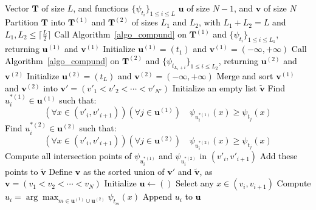 \documentclass[review]{elsarticle}
\newcommand{\cblue}{\textcolor{black}}
\begin{document}

\cblue{
\begin{algorithm}[H]
\caption{Recursive Compound Minimization Algorithm}
\label{algo_compund}
\begin{algorithmic}[1]
\Require Vector $\mathbf{T}$ of size $L$, and functions $\{\psi_{t_i}\}_{1 \leq i \leq L}$
\Ensure $\mathbf{u}$ of size $N-1$, and $\mathbf{v}$ of size $N$
\State Partition $\mathbf{T}$ into $\mathbf{T}^{(1)}$ and $\mathbf{T}^{(2)}$ of sizes $L_1$ and $L_2$, with $L_1 + L_2 = L$ and $L_1, L_2 \leq \lceil \tfrac{L}{2} \rceil$
    \State Call Algorithm~\ref{algo_compund} on $\mathbf{T}^{(1)}$ and $\{\psi_{t_i}\}_{1 \leq i \leq L_1}$, returning $\mathbf{u}^{(1)}$ and $\mathbf{v}^{(1)}$
\Else
    \State Initialize $\mathbf{u}^{(1)} = (t_1)$ and $\mathbf{v}^{(1)} = (-\infty, +\infty)$
\EndIf
{}
    \State Call Algorithm~\ref{algo_compund} on $\mathbf{T}^{(2)}$ and $\{\psi_{t_{L_1+i}}\}_{1 \leq i \leq L_2}$, returning $\mathbf{u}^{(2)}$ and $\mathbf{v}^{(2)}$
\Else
    \State Initialize $\mathbf{u}^{(2)} = (t_L)$ and $\mathbf{v}^{(2)} = (-\infty, +\infty)$
\EndIf
\State Merge and sort $\mathbf{v}^{(1)}$ and $\mathbf{v}^{(2)}$ into
$
\mathbf{v}' = (v'_1 < v'_2 < \cdots < v'_{N'})
$
\State Initialize an empty list $\tilde{\mathbf{v}}$
    \State Find $u_i^{*(1)} \in \mathbf{u}^{(1)}$ such that:
    \begin{equation}
        (\forall x \in (v'_i, v'_{i+1}))(\forall j \in \mathbf{u}^{(1)}) \quad \psi_{u_i^{*(1)}}(x) \geq \psi_{t_j}(x) \label{eq_upper_env_1}
    \end{equation}
    \State Find $u_i^{*(2)} \in \mathbf{u}^{(2)}$ such that:
    \begin{equation}
        (\forall x \in (v'_i, v'_{i+1}))(\forall j \in \mathbf{u}^{(2)}) \quad \psi_{u_i^{*(2)}}(x) \geq \psi_{t_j}(x) \label{eq_upper_env_2}
    \end{equation}
    \State Compute all intersection points of $\psi_{u_i^{*(1)}}$ and $\psi_{u_i^{*(2)}}$ in $(v'_i, v'_{i+1})$
    \State Add these points to $\tilde{\mathbf{v}}$
\EndFor
\State Define $\mathbf{v}$ as the sorted union of $\mathbf{v}'$ and $\tilde{\mathbf{v}}$, as
$
\mathbf{v} = (v_1 < v_2 < \cdots < v_N)
$
\State Initialize $\mathbf{u} \leftarrow ()$
    \State Select any $x \in (v_i, v_{i+1})$
    \State Compute
    $
    u_i = \arg\max_{m \in \mathbf{u}^{(1)} \cup \mathbf{u}^{(2)}} \psi_{t_m}(x)
    $
    \State Append $u_i$ to $\mathbf{u}$
\EndFor
\end{algorithmic}
\end{algorithm}
}
\end{document}

